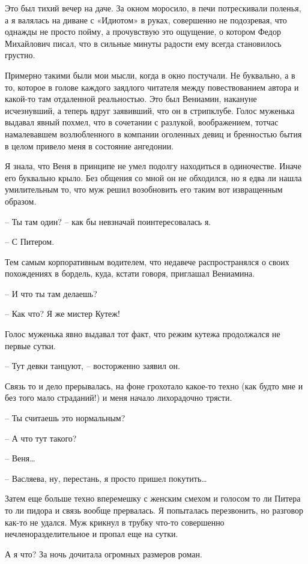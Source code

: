 \documentclass[
]{book}
\begin{document}
Это был тихий вечер на даче. За окном моросило, в печи потрескивали поленья, а я валялась на диване с «Идиотом» в руках, совершенно не подозревая, что однажды не просто пойму, а прочувствую это ощущение, о котором Федор Михайлович писал, что в сильные минуты радости ему всегда становилось грустно.

Примерно такими были мои мысли, когда в окно постучали. Не буквально, а в то, которое в голове каждого заядлого читателя между повествованием автора и какой-то там отдаленной реальностью. Это был Вениамин, накануне исчезнувший, а теперь вдруг заявивший, что он в стрипклубе. Голос муженька выдавал явный похмел, что в сочетании с разлукой, воображением, тотчас намалевавшем возлюбленного в компании оголенных девиц и бренностью бытия в целом привело меня в состояние ангедонии.

Я знала, что Веня в принципе не умел подолгу находиться в одиночестве. Иначе его буквально крыло. Без общения со мной он не обходился, но я едва ли нашла умилительным то, что муж решил возобновить его таким вот извращенным образом.

-- Ты там один? -- как бы невзначай поинтересовалась я.

-- С Питером.

Тем самым корпоративным водителем, что недавече распространялся о своих похождениях в бордель, куда, кстати говоря, приглашал Вениамина.

-- И что ты там делаешь?

-- Как что? Я же мистер Кутеж!

Голос муженька явно выдавал тот факт, что режим кутежа продолжался не первые сутки.

-- Тут девки танцуют, -- восторженно заявил он.

Связь то и дело прерывалась, на фоне грохотало какое-то техно (как будто мне и без того мало страданий!) и меня начало лихорадочно трясти.

-- Ты считаешь это нормальным?

-- А что тут такого?

-- Веня\ldots{}

-- Васляева, ну, перестань, я просто пришел покутить\ldots{}

Затем еще больше техно вперемешку с женским смехом и голосом то ли Питера то ли пидора и связь вообще прервалась. Я попыталась перезвонить, но разговор как-то не удался. Муж крикнул в трубку что-то совершенно нечленоразделительное и пропал еще на сутки.

А я что? За ночь дочитала огромных размеров роман.
\end{document}
